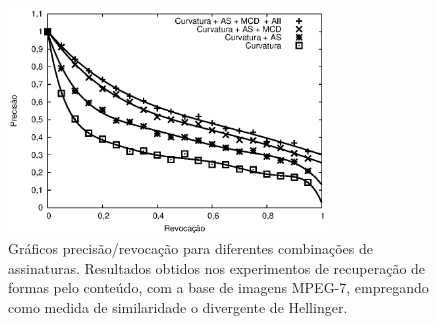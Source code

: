 \begin{figure}[h!]
  \caption{\label{fig:graph1} Gráficos precisão/revocação para diferentes combinações de assinaturas. Resultados obtidos nos experimentos de recuperação de formas pelo conteúdo, com a base de imagens MPEG-7, empregando como medida de similaridade o divergente de Hellinger. }
  \centering
  \includegraphics[width=0.75\textwidth]{graph1.eps}
\end{figure}


